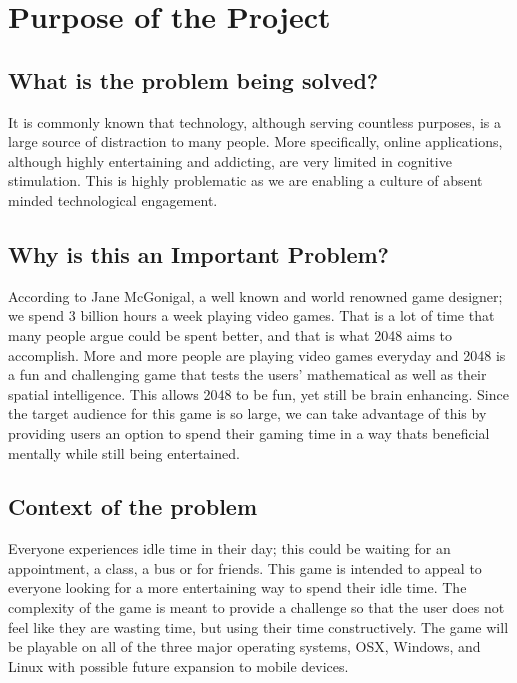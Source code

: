\newpage
\tableofcontents
\newpage
\listoftables
{}
\newpage
\listoffigures
{}
\newpage

\section{Purpose of the Project}
\subsection{What is the problem being solved?} 
\par\indent\indent It is commonly known that technology, although serving countless purposes, is a large source of distraction to many people. More specifically, online applications, although highly entertaining and addicting, 
are very limited in cognitive stimulation. This is highly problematic as we are enabling a culture of absent minded technological engagement.
\subsection{Why is this an Important Problem?} 
\par\indent\indent According to Jane McGonigal, a well known and world renowned game designer; we spend 3 
billion hours a week playing video games. That is a lot of time that many people argue could be spent better, and 
that is what 2048 aims to accomplish. More and more people are playing video games everyday and 2048 is a 
fun and challenging game that tests the users' mathematical as well as their spatial intelligence. This allows 2048 
to be fun, yet still be brain enhancing. Since the target audience for this game is so large, we can take advantage 
of this by providing users an option to spend their gaming time in a way thats beneficial mentally while still being 
entertained.
\subsection{Context of the problem} 
\par\indent\indent Everyone experiences idle time in their day; this could be waiting for an appointment, a class, a 
bus or for friends. This game is intended to appeal to everyone looking for a more entertaining way to spend their 
idle time. The complexity of the game is meant to provide a challenge so that the user does not feel like they are 
wasting time, but using their time constructively. The game will be playable on all of the three major operating 
systems, OSX, Windows, and Linux with possible future expansion to mobile devices.

